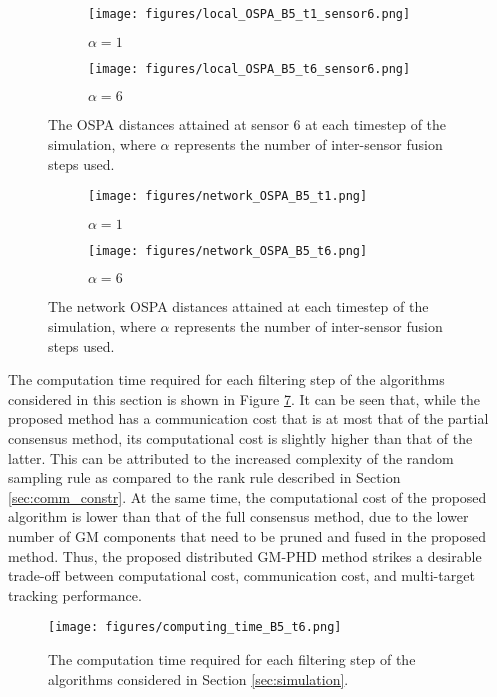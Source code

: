 \begin{figure}[h]
    \centering
    \begin{subfigure}[b]{0.239\textwidth}
    \centering
    \texttt{[image: figures/local\_OSPA\_B5\_t1\_sensor6.png]}
    \caption{$\alpha=1$}
    \label{fig_localOSPA_B5_t1_sensor6}
    \end{subfigure}
    \begin{subfigure}[b]{0.241\textwidth}
    \centering
    \texttt{[image: figures/local\_OSPA\_B5\_t6\_sensor6.png]}
    \caption{$\alpha=6$}
    \label{fig_localOSPA_B5_t6_sensor6}
    \end{subfigure}
    \caption{The OSPA distances attained at sensor 6 at each timestep of the simulation, where $\alpha$ represents the number of inter-sensor fusion steps used.}
    \label{fig_localOSPA_sensor6}
\end{figure}

\begin{figure}[h]
    \centering
    \begin{subfigure}[b]{0.237\textwidth}
    \centering
    \texttt{[image: figures/network\_OSPA\_B5\_t1.png]}
    \caption{$\alpha=1$}
    \label{fig_networkOSPA_B5_t1}
    \end{subfigure}
    \begin{subfigure}[b]{0.243\textwidth}
    \centering
    \texttt{[image: figures/network\_OSPA\_B5\_t6.png]}
    \caption{$\alpha=6$}
    \label{fig_networkOSPA_B5_t6}
    \end{subfigure}  
    \caption{The network OSPA distances attained at each timestep of the simulation, where $\alpha$ represents the number of inter-sensor fusion steps used.}
    \label{fig_networkOSPA}
\end{figure}

The computation time required for each filtering step of the algorithms considered in this section is shown in Figure \ref{fig_computeTime_B5}. It can be seen that, while the proposed method has a communication cost that is at most that of the partial consensus method, its computational cost is slightly higher than that of the latter. This can be attributed to the increased complexity of the random sampling rule as compared to the rank rule described in Section \ref{sec:comm_constr}. 
At the same time, the computational cost of the proposed algorithm is lower than that of the full consensus method, due to the lower number of GM components that need to be pruned and fused in the proposed method. Thus, the proposed distributed GM-PHD method strikes a desirable trade-off between computational cost, communication cost, and multi-target tracking performance.

\begin{figure}[h]
\centering
    \texttt{[image: figures/computing\_time\_B5\_t6.png]}
    \caption{The computation time required for each filtering step of the algorithms considered in Section \ref{sec:simulation}.}
    \label{fig_computeTime_B5}
\end{figure}



